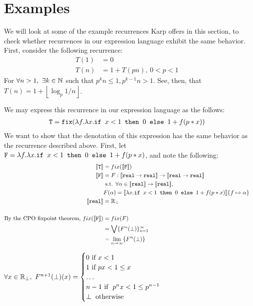 \section{Examples}
We will look at some of the example recurrences Karp offers in this section, to check whether recurrences in our expression
language exhibit the same behavior. First, consider the following recurrence:
\begin{align*}
T(1) &= 0 \\
T(n) &= 1 + T(pn), \ 0 < p < 1
\end{align*} 
For $\forall n > 1, \ \exists k \in \mathbb{N}$ such that $p^kn \leq1, p^{k-1}n > 1$. See, then, that $T(n) = 1 + \left \lfloor{\log_{p}1/n}\right \rfloor$.

We may express this recurrence in our expression language as the follows:
\begin{align*}
\texttt{T} = \texttt{fix}(\lambda f. \lambda x.\texttt{if } x<1 \texttt{ then } 0 \texttt{ else } 1 + f(p*x))
 \end{align*}
 We want to show that the denotation of this expression has the same behavior as the recurrence described above. 
 First, let $\texttt{F} =\lambda f. \lambda x.\texttt{if } x<1 \texttt{ then } 0 \texttt{ else } 1 + f(p*x)$, and note the following: 
 \begin{align*}
 \llbracket \texttt{T} \rrbracket &= fix(\llbracket \texttt{F} \rrbracket) \\
 \llbracket \texttt{F} \rrbracket &= F : \llbracket \texttt{real} \rightarrow \texttt{real}\rrbracket \rightarrow \llbracket \texttt{real} \rightarrow \texttt{real}\rrbracket \\ 
 &\text{ s.t. } \forall \alpha \in \llbracket \texttt{real}\rrbracket \rightarrow \llbracket \texttt{real} \rrbracket, \\   
 &F(\alpha) = \llbracket\lambda x.\texttt{if } x<1 \texttt{ then } 0 \texttt{ else } 1 + f(p*x)\rrbracket\{f \mapsto \alpha\} \\
 \llbracket \texttt{real}\rrbracket &= \mathbb{R}_{\perp}  \\
 \\\text{By the CPO fixpoint theorem, } fix(\llbracket \texttt{F} \rrbracket) &= fix(F) \\
&= \bigvee\{F^n (\perp)\}^{\infty}_{n=1} \\
&= \lim_{n \to \infty}\{F^n (\perp)\}
 \end{align*}
 \begin{lemma}
 $\forall x \in \R_{\perp}, \ F^{n+1}(\perp)(x) =  
 \begin{cases}
 0 \text{ if } x < 1 \\
 1 \text{ if } px < 1 \leq x \\
 \dots \\
 n - 1 \text{ if } \ p^{n}x < 1 \leq p^{n-1} \\
 \perp \text{ otherwise}
 \end{cases}$
 \end{lemma}
